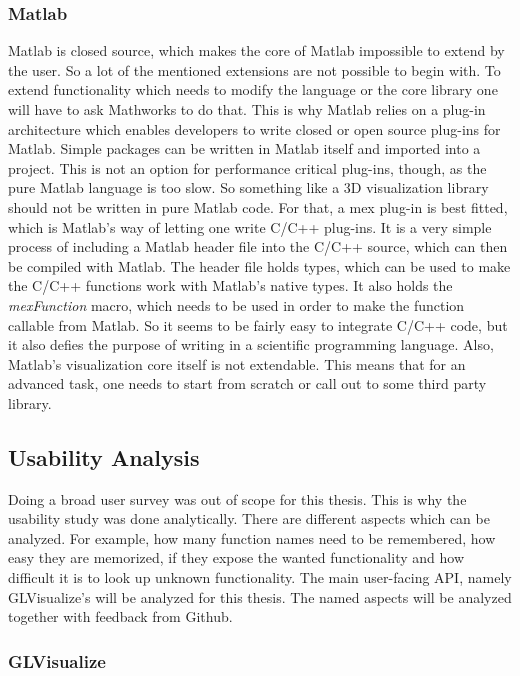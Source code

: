 {\subsubsection{Matlab}

Matlab is closed source, which makes the core of Matlab impossible to extend by the user. So a lot of the mentioned extensions are not possible to begin with. 
To extend functionality which needs to modify the language or the core library one will have to ask Mathworks to do that.
This is why Matlab relies on a plug-in architecture which enables developers to write closed or open source plug-ins for Matlab. 
Simple packages can be written in Matlab itself and imported into a project.
This is not an option for performance critical plug-ins, though, as the pure Matlab language is too slow.
So something like a 3D visualization library should not be written in pure Matlab code.
For that, a mex plug-in is best fitted, which is Matlab's way of letting one write C/C++ plug-ins.
It is a very simple process of including a Matlab header file into the C/C++ source, which can then be compiled with Matlab.
The header file holds types, which can be used to make the C/C++ functions work with Matlab's native types.
It also holds the \textit{mexFunction} macro, which needs to be used in order to make the function callable from Matlab.
So it seems to be fairly easy to integrate C/C++ code, but it also defies the purpose of writing in a scientific programming language.
Also, Matlab's visualization core itself is not extendable. 
This means that for an advanced task, one needs to start from scratch or call out to some third party library.


\subsection{Usability Analysis}
Doing a broad user survey was out of scope for this thesis.
This is why the usability study was done analytically.
There are different aspects which can be analyzed. For example, how many function names need to be remembered, how easy they are memorized, if they expose the wanted functionality and how difficult it is to look up unknown functionality.
The main user-facing \ac{API}, namely GLVisualize’s will be analyzed for this thesis. 
The named aspects will be analyzed together with feedback from Github.

\subsubsection{GLVisualize}

}
